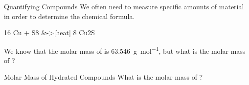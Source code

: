 \documentclass[handout]{beamer}
\begin{document}
\begin{frame}[t]{Quantifying Compounds}
	We often need to measure specific amounts of
	material in order to determine the chemical formula.
	\begin{reactions*}
		16 Cu\sld{} + S8\sld{} &->[heat] 8 Cu2S\sld{} \\
	\end{reactions*}
	\begin{example}
	We know that the \alert{molar mass} of  is
	\SI{63.546}{\gram\per\mole}, but what is the molar mass of ?
	\end{example}
\end{frame}

\begin{frame}[t]{Molar Mass of Hydrated Compounds}
	What is the molar mass of ?


\end{frame}
\end{document}
